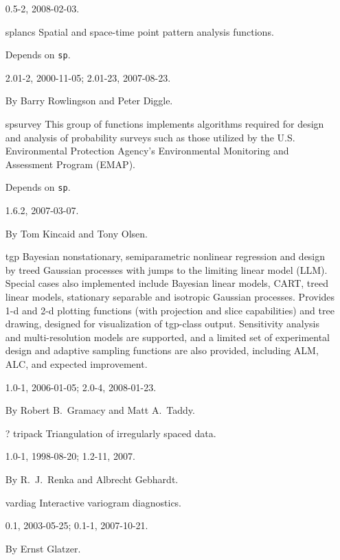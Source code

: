 \documentclass[12pt]{article}
\begin{document}
\begin{itemize}
0.5-2, 2008-02-03.

\item[splancs]
Spatial and space-time point pattern analysis functions.

Depends on \texttt{sp}.

2.01-2, 2000-11-05; 2.01-23, 2007-08-23.

By Barry Rowlingson and Peter Diggle.

\item[spsurvey]
This group of functions implements algorithms required for design and
analysis of probability surveys such as those utilized by the U.S.
Environmental Protection Agency's Environmental Monitoring and
Assessment Program (EMAP).

Depends on \texttt{sp}.

1.6.2, 2007-03-07.

By Tom Kincaid and Tony Olsen.

\item[tgp]
Bayesian nonstationary, semiparametric nonlinear regression and design
by treed Gaussian processes with jumps to the limiting linear model
(LLM). Special cases also implemented include Bayesian linear models,
CART, treed linear models, stationary separable and isotropic Gaussian
processes. Provides 1-d and 2-d plotting functions (with projection and
slice capabilities) and tree drawing, designed for visualization of
tgp-class output. Sensitivity analysis and multi-resolution models are
supported, and a limited set of experimental design and adaptive
sampling functions are also provided, including ALM, ALC, and expected
improvement.

1.0-1, 2006-01-05; 2.0-4, 2008-01-23.

By Robert B.\ Gramacy and Matt A.\ Taddy.

\item[? tripack]
Triangulation of irregularly spaced data.

1.0-1, 1998-08-20; 1.2-11, 2007.

By R.\ J.\ Renka and Albrecht Gebhardt.

\item[vardiag]
Interactive variogram diagnostics.

0.1, 2003-05-25; 0.1-1, 2007-10-21.

By Ernst Glatzer.

\end{itemize}
\end{document}
